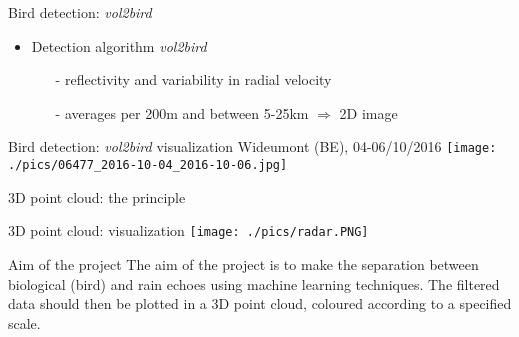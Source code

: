 \documentclass[usenames,dvipsnames]{beamer}
\begin{document}
\begin{frame}{Bird detection: \textit{vol2bird}}
\begin{itemize}
	\item Detection algorithm \textit{vol2bird} 
	\begin{itemize}
		\item[-] reflectivity and variability in radial velocity
		\item[-] averages per 200m and between 5-25km $\Rightarrow$ 2D image
	\end{itemize}
\end{itemize}
		\begin{center}
\end{center}
\end{frame}
	
\begin{frame}{Bird detection: \textit{vol2bird} visualization}
\centering
Wideumont (BE), 04-06/10/2016
\texttt{[image: ./pics/06477\_2016-10-04\_2016-10-06.jpg]}
\end{frame}	

	
\begin{frame}{3D point cloud: the principle}
\end{frame}	
	

\begin{frame}{3D point cloud: visualization}
\centering
\texttt{[image: ./pics/radar.PNG]}
\end{frame}	


\begin{frame}{Aim of the project}
The aim of the project is to make the separation between biological (bird) and rain echoes using machine learning techniques. The filtered data should then be plotted in a 3D point cloud, coloured according to a specified scale.
\end{frame}	
	
\end{document}
